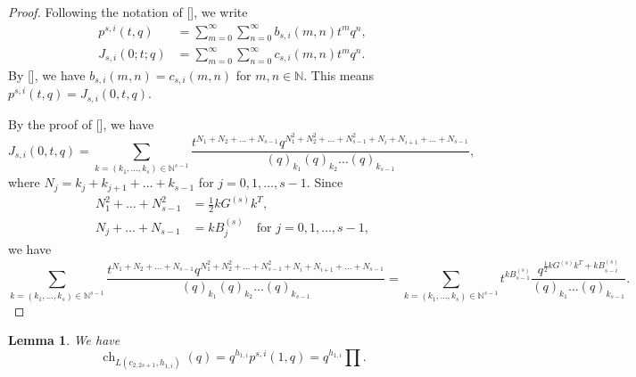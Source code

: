 \documentclass[a4paper, 12pt, reqno]{amsart}
\newtheorem{lemma}[theorem]{Lemma}
\theoremstyle{remark}
\DeclareMathOperator{\ch}{ch}
\begin{document}
\begin{proof}
  Following the notation of [], we write
  \begin{align*}
    p^{s, i}(t, q) &= \sum_{m = 0}^{\infty}\sum_{n = 0}^{\infty}b_{s, i}(m, n)t^mq^n, \\
    J_{s, i}(0; t; q) &= \sum_{m = 0}^{\infty}\sum_{n = 0}^{\infty}c_{s, i}(m, n)t^mq^n.
  \end{align*}
  By [], we have $b_{s, i}(m, n) = c_{s, i}(m, n)$ for $m, n \in \mathbb{N}$.
  This means $p^{s, i}(t, q) = J_{s, i}(0, t, q)$.

  By the proof of [], we have
  \begin{equation*}
    J_{s, i}(0, t, q) = \sum_{k = (k_1, \dots, k_s) \in \mathbb{N}^{s - 1}}\frac{t^{N_1 + N_2 + \dots + N_{s - 1}}q^{N_1^2 + N_2^2 + \dots + N_{s - 1}^2 + N_i + N_{i + 1} + \dots + N_{s - 1}}}{(q)_{k_1}(q)_{k_2}\dots(q)_{k_{s - 1}}},
  \end{equation*}
  where $N_j = k_j + k_{j + 1} + \dots + k_{s - 1}$ for $j = 0, 1, \dots, s - 1$.
  Since
  \begin{align*}
  N_1^2 + \dots + N_{s - 1}^2 &= \frac{1}{2}kG^{(s)}k^T, \\
  N_j + \dots + N_{s - 1} &= kB^{(s)}_{j} \quad \text{for $j = 0, 1, \dots, s - 1$},
  \end{align*}
  we have
  \begin{equation*}
    \sum_{k = (k_1, \dots, k_s) \in \mathbb{N}^{s - 1}}\frac{t^{N_1 + N_2 + \dots + N_{s - 1}}q^{N_1^2 + N_2^2 + \dots + N_{s - 1}^2 + N_i + N_{i + 1} + \dots + N_{s - 1}}}{(q)_{k_1}(q)_{k_2}\dots(q)_{k_{s - 1}}} = \sum_{k = (k_1, \dots, k_s) \in \mathbb{N}^{s - 1}}t^{kB^{(s)}_{s - 1}}\frac{q^{\frac{1}{2}kG^{(s)}k^T + kB^{(s)}_{s - i}}}{(q)_{k_1}\dots(q)_{k_{s - 1}}}.
  \end{equation*}
\end{proof}

\begin{lemma}
  \label{lmm:4}
  We have
  \begin{equation*}
    \ch_{L(c_{2, 2s + 1}, h_{1, i})}(q) = q^{h_{1, i}}p^{s, i}(1, q) = q^{h_{1, i}}\prod.
  \end{equation*}
\end{lemma}
\end{document}

